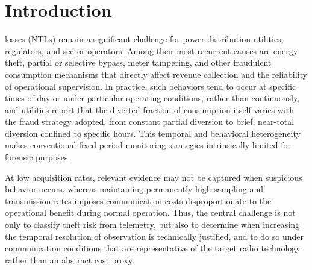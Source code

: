 \documentclass{ieeeaccess}
\begin{document}
\section{Introduction}
\label{sec:introduction}
 losses (NTLs) remain a significant challenge for power distribution utilities, regulators, and sector operators. Among their most recurrent causes are energy theft, partial or selective bypass, meter tampering, and other fraudulent consumption mechanisms that directly affect revenue collection and the reliability of operational supervision. In practice, such behaviors tend to occur at specific times of day or under particular operating conditions, rather than continuously, and utilities report that the diverted fraction of consumption itself varies with the fraud strategy adopted, from constant partial diversion to brief, near-total diversion confined to specific hours. This temporal and behavioral heterogeneity makes conventional fixed-period monitoring strategies intrinsically limited for forensic purposes.

At low acquisition rates, relevant evidence may not be captured when suspicious behavior occurs, whereas maintaining permanently high sampling and transmission rates imposes communication costs disproportionate to the operational benefit during normal operation. Thus, the central challenge is not only to classify theft risk from telemetry, but also to determine when increasing the temporal resolution of observation is technically justified, and to do so under communication conditions that are representative of the target radio technology rather than an abstract cost proxy.
\end{document}
